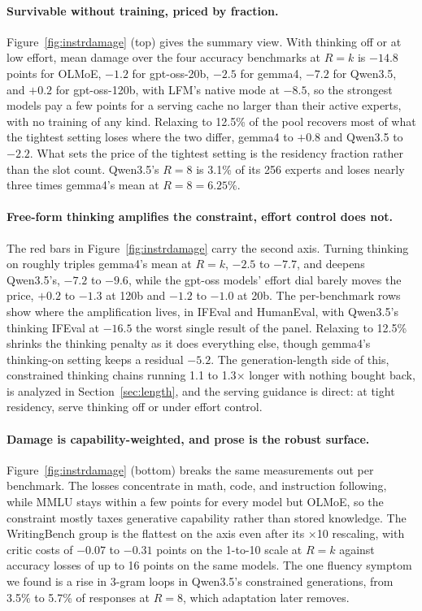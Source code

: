 \documentclass{article}
\begin{document}
\paragraph{Survivable without training, priced by fraction.} Figure~\ref{fig:instrdamage}
(top) gives the summary view. With thinking off or at low effort, mean damage over the four
accuracy benchmarks at $R=k$ is $-14.8$ points for OLMoE, $-1.2$ for gpt-oss-20b, $-2.5$ for
gemma4, $-7.2$ for Qwen3.5, and $+0.2$ for gpt-oss-120b, with LFM's native mode at $-8.5$,
so the strongest models pay a few points for a serving cache no larger than their active
experts, with no training of any kind. Relaxing to 12.5\% of the pool recovers most of what
the tightest setting loses where the two differ, gemma4 to $+0.8$ and Qwen3.5 to $-2.2$. What sets the
price of the tightest setting is the residency fraction rather than the slot count. Qwen3.5's $R=8$ is 3.1\%
of its 256 experts and loses nearly three times gemma4's mean at $R=8=6.25\%$.

\paragraph{Free-form thinking amplifies the constraint, effort control does not.} The red
bars in Figure~\ref{fig:instrdamage} carry the second axis. Turning thinking on roughly
triples gemma4's mean at $R=k$, $-2.5$ to $-7.7$, and deepens Qwen3.5's, $-7.2$ to $-9.6$,
while the gpt-oss models' effort dial barely moves the price, $+0.2$ to $-1.3$ at 120b and
$-1.2$ to $-1.0$ at 20b. The per-benchmark rows show where the amplification lives, in
IFEval and HumanEval, with Qwen3.5's thinking IFEval at $-16.5$ the worst single result of the panel.
Relaxing to 12.5\% shrinks the thinking penalty as it does everything else, though gemma4's
thinking-on setting keeps a residual $-5.2$. The generation-length side of this, constrained
thinking chains running 1.1 to 1.3$\times$ longer with nothing bought back, is analyzed in
Section~\ref{sec:length}, and the serving guidance is direct: at tight residency, serve
thinking off or under effort control.

\paragraph{Damage is capability-weighted, and prose is the robust surface.}
Figure~\ref{fig:instrdamage} (bottom) breaks the same measurements out per benchmark. The losses
concentrate in math, code, and instruction following, while MMLU stays within a few points
for every model but OLMoE, so the constraint mostly taxes generative capability rather than
stored knowledge. The WritingBench group is the flattest on the axis even after its
$\times$10 rescaling, with critic costs of $-0.07$ to $-0.31$ points on the 1-to-10 scale at
$R=k$ against accuracy losses of up to 16 points on the same models. The one fluency symptom
we found is a rise in 3-gram loops in Qwen3.5's constrained generations, from 3.5\% to 5.7\% of
responses at $R=8$, which adaptation later removes.
\end{document}
